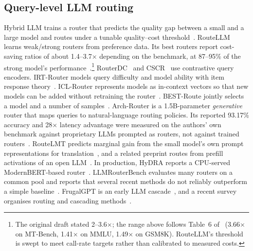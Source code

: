\documentclass[lettersize,journal]{IEEEtran}
\begin{document}
\subsection{Query-level LLM routing}
Hybrid LLM trains a router that predicts the quality gap between a small and a
large model and routes under a tunable quality--cost
threshold~\cite{ding2024hybrid}. RouteLLM learns weak/strong routers from
preference data. Its best routers report cost-saving ratios of about
1.4--3.7$\times$ depending on the benchmark, at 87--95\% of the strong model's
performance~\cite{ong2025routellm}.\footnote{The original draft stated
2--3.6$\times$; the range above follows Table~6 of~\cite{ong2025routellm}
(3.66$\times$ on MT-Bench, 1.41$\times$ on MMLU, 1.49$\times$ on GSM8K).
RouteLLM's threshold is swept to meet call-rate targets rather than calibrated to
measured costs.} RouterDC~\cite{chen2024routerdc} and CSCR~\cite{shirkavand2025cost}
use contrastive query encoders. IRT-Router models query difficulty and model
ability with item response theory~\cite{song2025irt}. ICL-Router represents
models as in-context vectors so that new models can be added without retraining
the router~\cite{wang2026icl}. BEST-Route jointly selects a model and a number of
samples~\cite{ding2025best}. Arch-Router is a 1.5B-parameter \emph{generative}
router that maps queries to natural-language routing policies. Its reported
93.17\% accuracy and 28$\times$ latency advantage were measured on the authors'
own benchmark against proprietary LLMs prompted as routers, not against trained
routers~\cite{tran2025arch}. RouteLMT predicts marginal gain from the small
model's own prompt representations for translation~\cite{luo2026routelmt}, and
a related preprint routes from prefill activations of an open LLM~\cite{varshney2026llm}.
In production, HyDRA reports a CPU-served ModernBERT-based router~\cite{garg2026hydra}.
LLMRouterBench evaluates many routers on a common pool and reports that several
recent methods do not reliably outperform a simple baseline~\cite{li2026llmrouterbench}.
FrugalGPT is an early LLM cascade~\cite{chen2023frugalgpt}, and a recent survey organises routing and cascading methods~\cite{moslem2026dynamic}.
\end{document}
